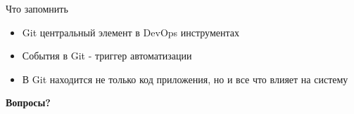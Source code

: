 \documentclass[aspectratio=169]{beamer}
\begin{document}
    \begin{frame}{Что запомнить}
        \begin{itemize}
            \item Git центральный элемент в DevOps инструментах
            \item События в Git - триггер автоматизации
            \item В Git находится не только код приложения, но и все что влияет на систему
        \end{itemize}

        \vspace{1cm}

        \begin{center}
            \textbf{Вопросы?}
        \end{center}
    \end{frame}
\end{document}
